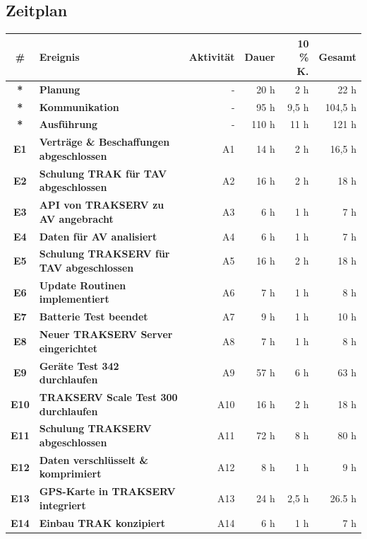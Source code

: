 \documentclass[a4paper,10pt]{scrartcl}
\begin{document}
\subsection{Zeitplan}
\begin{adjustbox}{width=\textwidth}
\begin{tabular}{clrrrr} 
\toprule
\textbf{\#}& \textbf{Ereignis} & \textbf{Aktivität} & \textbf{Dauer} & \textbf{10 \% K.} & \textbf{Gesamt}\\ 
\midrule 
\midrule
\textbf{*} &\textbf{Planung} 						&-			& 20 h &  2 h&  22 h\\
\textbf{*} &\textbf{Kommunikation} 					&-			& 95 h &  9,5 h&  104,5 h\\ %
\textbf{*} &\textbf{Ausführung} 					&-			& 110 h & 11 h& 121 h\\ %
\textbf{E1} &\textbf{Verträge \& Beschaffungen abgeschlossen} 		&A1		& 14  h & 2 h& 16,5 h\\
\textbf{E2} &\textbf{Schulung TRAK für TAV abgeschlossen} 			&A2			& 16 h & 2 h& 18 h\\
\textbf{E3} &\textbf{API von TRAKSERV zu AV angebracht} 			&A3		& 6  h &   1 h&   7 h\\
\textbf{E4} &\textbf{Daten für AV analisiert} 						&A4		& 6 h & 1 h& 7 h\\
\textbf{E5} &\textbf{Schulung TRAKSERV für TAV abgeschlossen} 		&A5			& 16 h & 2 h& 18 h\\
\textbf{E6} &\textbf{Update Routinen implementiert} 				&A6		& 7 h & 1 h& 8 h\\
\textbf{E7} &\textbf{Batterie Test beendet} 			&A7			& 9 h & 1 h& 10 h\\
\textbf{E8} &\textbf{Neuer TRAKSERV Server eingerichtet} &A8		& 7 h & 1 h& 8 h\\
\textbf{E9} &\textbf{Geräte Test 342 durchlaufen} &A9		& 57 h & 6 h& 63 h\\
\textbf{E10} &\textbf{TRAKSERV Scale Test 300 durchlaufen}&A10		& 16 h & 2 h& 18 h\\
\textbf{E11} &\textbf{Schulung TRAKSERV abgeschlossen} 		&A11			& 72 h & 8 h& 80 h\\
\textbf{E12} &\textbf{Daten verschlüsselt \& komprimiert} 	&A12		& 8 h & 1 h& 9 h\\
\textbf{E13} &\textbf{GPS-Karte in TRAKSERV integriert} 		&A13		& 24 h & 2,5 h& 26.5 h\\
\textbf{E14} &\textbf{Einbau TRAK konzipiert} 			&A14		& 6 h & 1 h& 7 h\\

\end{tabular}
\end{adjustbox}
\end{document}
